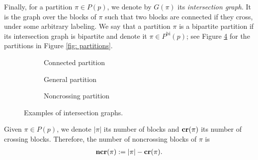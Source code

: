 \documentclass[12pt,reqno]{amsart}
\theoremstyle{plain}
\newcommand{\1}{\mathbf{1}}
\newcommand{\crblocks}{\operatorname{\bf cr}}
\newcommand{\ncrblocks}{\operatorname{\bf ncr}}
\begin{document}
Finally, for a partition $\pi \in P(p)$, we denote by $G(\pi)$ its \textit{intersection graph}. It is the graph over the blocks of $\pi$ such that two blocks are connected if they cross, under some arbitrary labeling. We say that a partition $\pi$ is a bipartite partition if its intersection graph is bipartite and denote it $\pi \in P^{\operatorname{bi}}(p)$; see Figure \ref{fig: partitions gc} for the partitions in Figure \ref{fig: partitions}.
\begin{figure}[H]
     \centering
     \begin{subfigure}[b]{0.3\textwidth}
         \centering
        \caption{Connected partition}
        \label{fig: connected partition gc}
    \end{subfigure}
     \hfill
     \begin{subfigure}[b]{0.3\textwidth}
         \centering
         \caption{General partition}
         \label{fig: general partition gc}
     \end{subfigure}
     \hfill
     \begin{subfigure}[b]{0.3\textwidth}
         \centering
         \caption{Noncrossing partition}
         \label{fig: noncrossing partition gc}
     \end{subfigure}
        \caption{Examples of intersection graphs.}
        \label{fig: partitions gc}
\end{figure}
Given $\pi\in P(p)$, we denote $|\pi|$ its number of blocks and $\crblocks(\pi)$ its number of crossing blocks. Therefore, the number of noncrossing blocks of $\pi$ is
\begin{align*}
    \ncrblocks(\pi):=|\pi|-\crblocks(\pi).
\end{align*}
\end{document}

